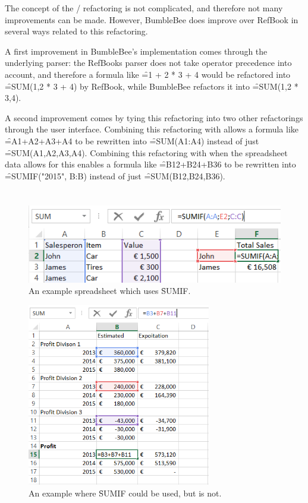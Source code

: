 The concept of the / refactoring is not complicated, and therefore not many improvements can be made.
However, BumbleBee does improve over RefBook in several ways related to this refactoring.

A first improvement in BumbleBee's implementation comes through the underlying parser: the RefBooks parser does not take operator precedence into account, and therefore a formula like \f{=1 + 2 * 3 + 4} would be refactored into \f{=SUM(1,2 * 3 + 4)} by RefBook, while BumbleBee refactors it into \f{=SUM(1,2 * 3,4)}.

A second improvement comes by tying this refactoring into two other refactorings through the user interface.
Combining this refactoring with  allows a formula like \f{=A1+A2+A3+A4} to be rewritten into \f{=SUM(A1:A4)} instead of just \f{=SUM(A1,A2,A3,A4)}.
Combining this refactoring with  when the spreadsheet data allows for this enables a formula like \f{=B12+B24+B36} to be rewritten into \f{=SUMIF("2015", B:B)} instead of just \f{=SUM(B12,B24,B36)}.

\section{}
\label{refac:introduceconditionalaggregate}

\begin{figure}
\centering
\includegraphics{implementation/aggregate/sumifexample}
\caption{An example spreadsheet which uses \f{SUMIF}.}
\label{fig:sumifexample}
\end{figure}

\begin{figure}
	\centering
	\includegraphics[height=8cm]{implementation/aggregate/condaggrexample}
	\caption{An example where \f{SUMIF} could be used, but is not.}
	\label{fig:sumifexample}
\end{figure}

